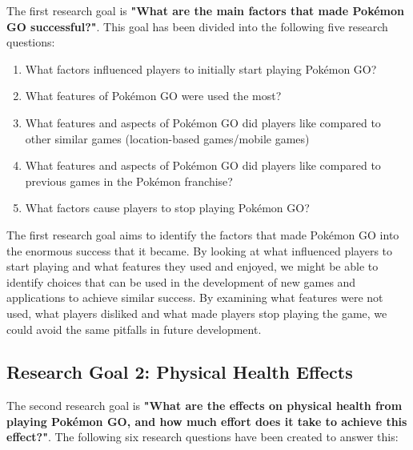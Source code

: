 The first research goal is \textbf{"What are the main factors that made Pokémon GO successful?"}. This goal has been divided into the following five research questions:

\begin{enumerate}[label=RQ1.{\arabic*}]
	\item What factors influenced players to initially start playing Pokémon GO?\label{RQ1.1}
	\item What features of Pokémon GO were used the most?\label{RQ1.2}
	\item What features and aspects of Pokémon GO did players like compared to other similar games (location-based games/mobile games)\label{RQ1.3}
	\item What features and aspects of Pokémon GO did players like compared to previous games in the Pokémon franchise?\label{RQ1.4}
	\item What factors cause players to stop playing Pokémon GO?\label{RQ1.5}
\end{enumerate}

The first research goal aims to identify the factors that made Pokémon GO into the enormous success that it became. By looking at what influenced players to start playing and what features they used and enjoyed, we might be able to identify choices that can be used in the development of new games and applications to achieve similar success. By examining what features were not used, what players disliked and what made players stop playing the game, we could avoid the same pitfalls in future development.

\subsection{Research Goal 2: Physical Health Effects}
\label{rg2}

The second research goal is \textbf{"What are the effects on physical health from playing Pokémon GO, and how much effort does it take to achieve this effect?"}. The following six research questions have been created to answer this:

